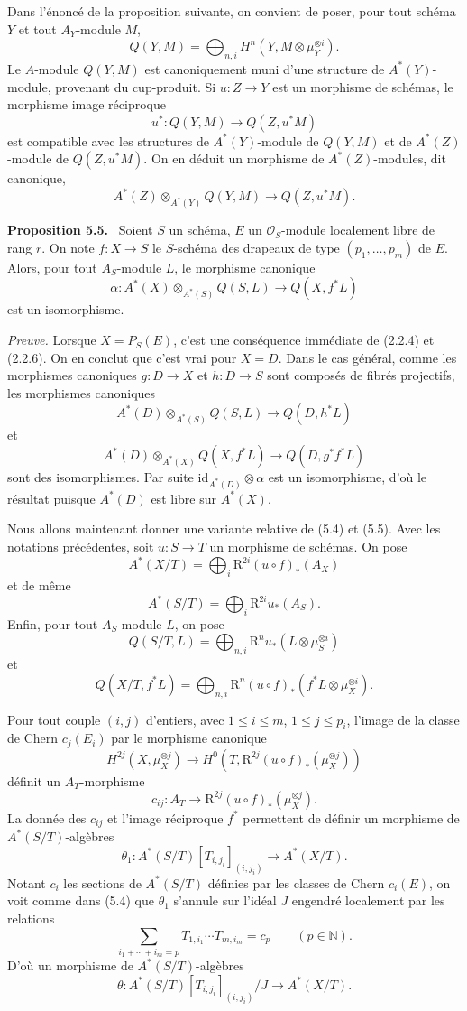 \documentclass[11pt]{article}
\newenvironment{statement}[1]{\par\medskip\noindent\textbf{#1.}\ }{\par\medskip}
\newcommand{\R}{\mathrm{R}}\newcommand{\RHomCore}{\mathrm{RHom}}
\providecommand{\R}{\mathrm R}
\begin{document}
Dans l'énoncé de la proposition suivante, on convient de poser, pour tout schéma $Y$ et tout $A_Y$-module $M$,
\[
Q(Y,M)=\bigoplus_{n,i}H^n(Y,M\otimes\mu_Y^{\otimes i}).
\]
Le $A$-module $Q(Y,M)$ est canoniquement muni d'une structure de $A^*(Y)$-module, provenant du cup-produit. Si $u:Z\to Y$ est un morphisme de schémas, le morphisme image réciproque
\[
u^*:Q(Y,M)\to Q(Z,u^*M)
\]
est compatible avec les structures de $A^*(Y)$-module de $Q(Y,M)$ et de $A^*(Z)$-module de $Q(Z,u^*M)$. On en déduit un morphisme de $A^*(Z)$-modules, dit canonique,
\[
A^*(Z)\otimes_{A^*(Y)}Q(Y,M)\to Q(Z,u^*M).
\]

\begin{statement}{Proposition 5.5}
Soient $S$ un schéma, $E$ un $\mathcal O_S$-module localement libre de rang $r$. On note $f:X\to S$ le $S$-schéma des drapeaux de type $(p_1,\ldots,p_m)$ de $E$. Alors, pour tout $A_S$-module $L$, le morphisme canonique
\[
\alpha:A^*(X)\otimes_{A^*(S)}Q(S,L)\to Q(X,f^*L)
\]
est un isomorphisme.
\end{statement}

\emph{Preuve.} Lorsque $X=P_S(E)$, c'est une conséquence immédiate de (2.2.4) et (2.2.6). On en conclut que c'est vrai pour $X=D$. Dans le cas général, comme les morphismes canoniques $g:D\to X$ et $h:D\to S$ sont composés de fibrés projectifs, les morphismes canoniques
\[
A^*(D)\otimes_{A^*(S)}Q(S,L)\to Q(D,h^*L)
\]
et
\[
A^*(D)\otimes_{A^*(X)}Q(X,f^*L)\to Q(D,g^*f^*L)
\]
sont des isomorphismes. Par suite $\mathrm{id}_{A^*(D)}\otimes\alpha$ est un isomorphisme, d'où le résultat puisque $A^*(D)$ est libre sur $A^*(X)$.

Nous allons maintenant donner une variante relative de (5.4) et (5.5). Avec les notations précédentes, soit $u:S\to T$ un morphisme de schémas. On pose
\[
A^*(X/T)=\bigoplus_i \R^{2i}(u\circ f)_*(A_X)
\]
et de même
\[
A^*(S/T)=\bigoplus_i \R^{2i}u_*(A_S).
\]
Enfin, pour tout $A_S$-module $L$, on pose
\[
Q(S/T,L)=\bigoplus_{n,i}\R^n u_*(L\otimes\mu_S^{\otimes i})
\]
et
\[
Q(X/T,f^*L)=\bigoplus_{n,i}\R^n(u\circ f)_*(f^*L\otimes\mu_X^{\otimes i}).
\]

Pour tout couple $(i,j)$ d'entiers, avec $1\le i\le m$, $1\le j\le p_i$, l'image de la classe de Chern $c_j(E_i)$ par le morphisme canonique
\[
H^{2j}(X,\mu_X^{\otimes j})
\to H^0(T,\R^{2j}(u\circ f)_*(\mu_X^{\otimes j}))
\]
définit un $A_T$-morphisme
\[
c_{ij}:A_T\to \R^{2j}(u\circ f)_*(\mu_X^{\otimes j}).
\]
La donnée des $c_{ij}$ et l'image réciproque $f^*$ permettent de définir un morphisme de $A^*(S/T)$-algèbres
\[
\theta_1:A^*(S/T)[T_{i,j_i}]_{(i,j_i)}\to A^*(X/T).
\]
Notant $c_i$ les sections de $A^*(S/T)$ définies par les classes de Chern $c_i(E)$, on voit comme dans (5.4) que $\theta_1$ s'annule sur l'idéal $J$ engendré localement par les relations
\[
\sum_{i_1+\cdots+i_m=p}T_{1,i_1}\cdots T_{m,i_m}=c_p\qquad(p\in\mathbb N).
\]
D'où un morphisme de $A^*(S/T)$-algèbres
\[
\theta:A^*(S/T)[T_{i,j_i}]_{(i,j_i)}/J\to A^*(X/T).
\]
\end{document}

